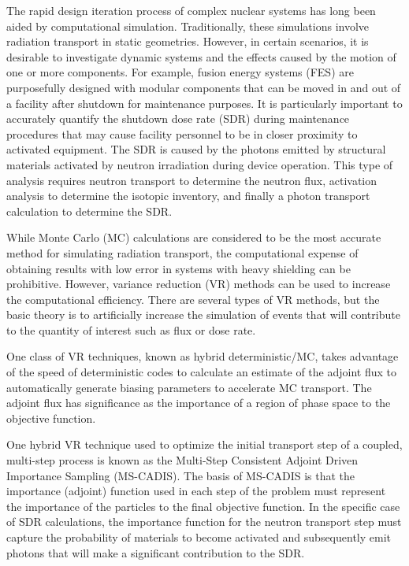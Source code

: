 \documentclass[12pt]{article}
\begin{document}
\maketitle

The rapid design iteration process of complex nuclear systems has long been
aided by computational simulation.  Traditionally, these simulations
involve radiation transport in static geometries.  However, in certain
scenarios, it is desirable to investigate dynamic systems and the effects caused
by the motion of one or more components.  
For example, fusion energy systems (FES) are purposefully designed with modular components that can be moved in and
out of a facility after shutdown for maintenance purposes.  
  It is particularly important to accurately quantify 
the shutdown dose rate (SDR)
during maintenance procedures that may cause facility personnel to be in closer
proximity to activated equipment.
The SDR is caused by the photons emitted by structural materials activated by
neutron irradiation during device operation.
This type of analysis requires neutron transport to determine the neutron flux,
activation analysis to determine the isotopic inventory, and finally a 
photon transport calculation to determine the SDR.

While Monte Carlo (MC) calculations are considered to be the most accurate method for simulating
radiation transport, the computational expense of obtaining results with low
error 
in systems with heavy shielding can be prohibitive.  
However, variance reduction (VR)
methods can be used to increase the computational efficiency.  
There are several types
of VR methods, but the basic theory is to artificially increase the simulation of
events that will contribute to the quantity of interest such as flux or dose
rate. 

One class of VR techniques, known as hybrid deterministic/MC, takes advantage of
the speed of deterministic codes to calculate an estimate of the adjoint 
flux
to automatically
generate biasing parameters to accelerate MC transport. 
The adjoint flux has significance as the importance of a region of
phase space to the objective function.

One hybrid VR technique used to optimize the initial transport step of a coupled,
multi-step process is known as 
the Multi-Step Consistent Adjoint Driven Importance Sampling
(MS-CADIS). 
 The basis of MS-CADIS is that the importance (adjoint) function used
in each step of the problem must represent the importance of the particles to
the final objective function.  
In the specific case of SDR calculations, the importance function for the neutron transport step
must capture the probability of materials to become activated and subsequently emit photons that
will make a significant contribution to the SDR.
\end{document}

